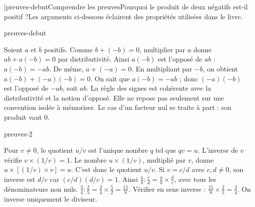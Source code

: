 \editionPage[\pdfbookmark[0]{Démonstrations}{bm-preuves-debut-parent}]{preuves-debut}{Comprendre les preuves}{Pourquoi le produit de deux négatifs est-il positif ?}{Les arguments ci-dessous éclairent des propriétés utilisées dans le livre.}
\begin{blocEdition}{preuves-debut}

Soient $a$ et $b$ positifs. Comme $b+(-b)=0$, multiplier par $a$ donne $ab+a(-b)=0$ par distributivité. Ainsi $a(-b)$ est l’opposé de $ab$ : $a(-b)=-ab$.
De même, $a+(-a)=0$. En multipliant par $-b$, on obtient $a(-b)+(-a)(-b)=0$. On sait que $a(-b)=-ab$ ; donc $(-a)(-b)$ est l’opposé de $-ab$, soit $ab$.
La règle des signes est cohérente avec la distributivité et la notion d’opposé. Elle ne repose pas seulement sur une convention isolée à mémoriser. Le cas d’un facteur nul se traite à part : son produit vaut 0.
\end{blocEdition}
\begin{blocEdition}{preuves-2}

Pour $v\ne0$, le quotient $u/v$ est l’unique nombre $q$ tel que $qv=u$.
L’inverse de $v$ vérifie $v\times(1/v)=1$. Le nombre $u\times(1/v)$, multiplié par $v$, donne $u\times[(1/v)\times v]=u$. C’est donc le quotient $u/v$.
Si $v=c/d$ avec $c,d\ne0$, son inverse est $d/c$ car $(c/d)(d/c)=1$. Ainsi $\frac ab:\frac cd=\frac ab\times\frac dc$, avec tous les dénominateurs non nuls.
$\frac34:\frac25=\frac34\times\frac52=\frac{15}{8}$. Vérifier en sens inverse : $\frac{15}{8}\times\frac25=\frac34$. On inverse uniquement le diviseur.
\end{blocEdition}

